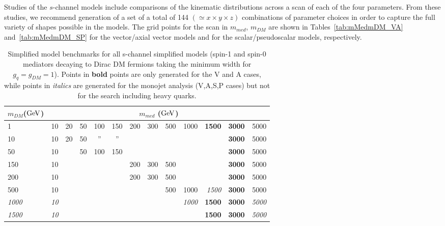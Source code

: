 \documentclass[a4,debug,notitlepage,nobib]{tufte-handout}
\newcommand{\ditto}[1][.4pt]{\xrfill{#1}~''~\xrfill{#1}}
\newcommand{\mdm}{\ensuremath{m_{DM}}\xspace}
\begin{document}
Studies of the $s$-channel models include comparisons of the kinematic
distributions across a scan of each of the four parameters. From these
studies, we recommend generation of a set of a total of 144
$(\simeq x\times y\times z)$ 
combinations of parameter choices in order to capture the full variety
of shapes possible in the models.
The grid points for the scan in $m_{med}$, \mdm are shown in
Tables~\ref{tab:mMedmDM_VA} and~\ref{tab:mMedmDM_SP} 
for the vector/axial vector models and for the scalar/pseudoscalar models,
respectively. 




\begin{table}[!h]
\centering
\begin{tabular}{| l |r r r r r r r r r r r r|}
\hline
\multicolumn{1}{|c|}{\mdm (${\rm GeV}$)} & \multicolumn{12}{c|}{$m_{med}$ (${\rm GeV}$)} \\
\hline
 1    & 10 & 20 & 50 & 100 & 150 & 200 & 300 & 500 & 1000 & \textbf{1500} & \textbf{3000} & 5000  \\
 10   & 10 & 20 & 50 & \ditto    & \ditto    &     &     &     &      &               & \textbf{3000} & 5000  \\
 50   & 10 &    & 50 & 100 & 150 &     &     &     &      &               & \textbf{3000} & 5000  \\
 150  & 10 &    &    &     &     & 200 & 300 & 500 &      &               & \textbf{3000} & 5000  \\
 200  & 10 &    &    &     &     & 200 & 300 & 500  &     &               & \textbf{3000} & 5000  \\
 500  & 10 &    &    &     &     &     &     & 500 & 1000 & \textit{1500} & \textbf{3000} & 5000  \\
 \textit{1000} & \textit{10} &    &    &     &     &     &     & & \textit{1000} & \textbf{1500} & \textbf{3000} & \textit{5000}  \\
 \textit{1500} & \textit{10} &    &    &     &     &     &     &              & & \textbf{1500} & \textbf{3000} & \textit{5000}  \\
\hline
\end{tabular}
\caption{Simplified model benchmarks for all s-channel simplified models (spin-1 and spin-0 mediators 
decaying to Dirac DM fermions taking the minimum width for $g_{q} = g_{DM} = 1$).
Points in \textbf{bold} points are only generated for the V and A cases, while points in 
\textit{italics} are generated for the monojet analysis (V,A,S,P cases) 
but not for the search including heavy quarks. }
\label{tab:ttdm_benchmarks}
\end{table}
\end{document}
